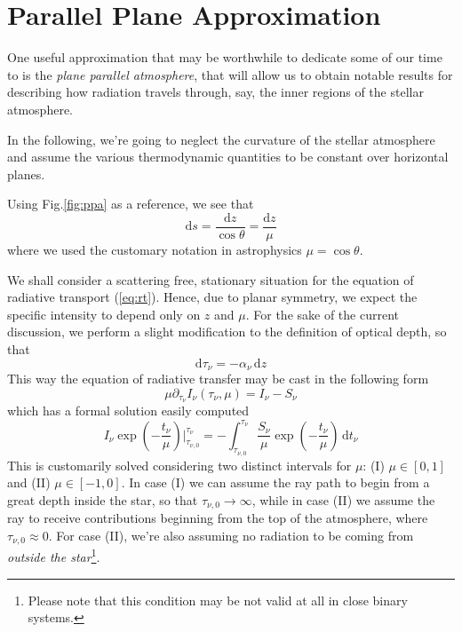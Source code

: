 \section*{Parallel Plane Approximation}
One useful approximation that may be worthwhile to dedicate some of our time to is the \emph{plane parallel atmosphere}, that will allow us to obtain notable results for describing how radiation travels through, say, the inner regions of the stellar atmosphere.
\par In the following, we're going to neglect the curvature of the stellar atmosphere and assume the various thermodynamic quantities to be constant over horizontal planes.

\par Using Fig.\ref{fig:ppa} as a reference, we see that 
\begin{equation*}
	\text{d}s = \frac{\text{d}z}{\cos\theta} = \frac{\text{d}z}{\mu}
\end{equation*}
where we used the customary notation in astrophysics $\mu = \cos\theta$.
\par We shall consider a scattering free, stationary situation for the equation of radiative transport (\ref{eq:rt}). Hence, due to planar symmetry, we expect the specific intensity to depend only on $z$ and $\mu$. For the sake of the current discussion, we perform a slight modification to the definition of optical depth, so that 
\begin{equation*}
	\text{d}\tau_{\nu} = -\alpha_{\nu}\,\text{d}z
\end{equation*}
This way the equation of radiative transfer may be cast in the following form 
\begin{equation*}
	\mu\partial_{\tau_{\nu}}I_{\nu}(\tau_{\nu}, \mu) = I_{\nu}- S_{\nu}
\end{equation*}
which has a formal solution easily computed 
\begin{equation}
	I_{\nu}\exp\left(-\frac{t_{\nu}}{\mu}\right)|^{\tau_{\nu}}_{\tau_{\nu,0}} = -\int_{\tau_{\nu,0}}^{\tau_{\nu}} \frac{S_{\nu}}{\mu}\exp\left(-\frac{t_{\nu}}{\mu}\right)\,\text{d}t_{\nu}
	\label{eq:ppart}
\end{equation}
This is customarily solved considering two distinct intervals for $\mu$: (I) $\mu\in[0,1]$ and (II) $\mu\in[-1,0]$. In case (I) we can assume the ray path to begin from a great depth inside the star, so that $\tau_{\nu,0}\to\infty$, while in case (II) we assume the ray to receive contributions beginning from the top of the atmosphere, where $\tau_{\nu,0}\approx 0$. For case (II), we're also assuming no radiation to be coming from \emph{outside the star}\footnote{Please note that this condition may be not valid at all in close binary systems.}.
